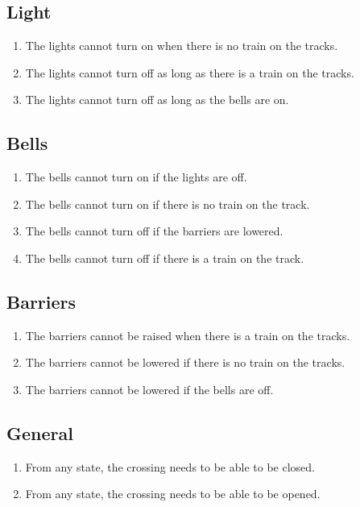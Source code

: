 \documentclass[final]{report}
\begin{document}
\subsection{Light}
	\begin{enumerate}
		\item The lights cannot turn on when there is no train on the tracks.
		\item The lights cannot turn off as long as there is a train on the tracks.
		\item The lights cannot turn off as long as the bells are on.
	\end{enumerate}

\subsection{Bells}
	\begin{enumerate}
		\item The bells cannot turn on if the lights are off.
		\item The bells cannot turn on if there is no train on the track.
		\item The bells cannot turn off if the barriers are lowered.
		\item The bells cannot turn off if there is a train on the track.
	\end{enumerate}

\subsection{Barriers}
	\begin{enumerate}
		\item The barriers cannot be raised when there is a train on the tracks.
		\item The barriers cannot be lowered if there is no train on the tracks.
		\item The barriers cannot be lowered if the bells are off.
	\end{enumerate}
	
\subsection{General}
	\begin{enumerate}
	\item From any state, the crossing needs to be able to be closed.
	\item From any state, the crossing needs to be able to be opened.
	\end{enumerate}
\end{document}
